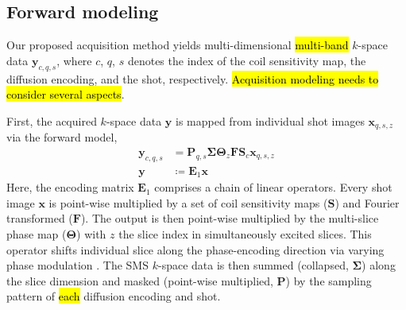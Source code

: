 \documentclass[preprint,12pt,authoryear,review]{elsarticle}
\begin{document}
    \pagebreak

    \subsection{Forward modeling}
    Our proposed acquisition method yields
    multi-dimensional \hl{multi-band} 
    $k$-space data $\mathbf{y}_{c,q,s}$,
    where $c$, $q$, $s$ denotes the index of the coil sensitivity map,
    the diffusion encoding, and the shot, respectively.
    \hl{Acquisition modeling needs to consider several aspects}.

    First, the acquired $k$-space data $\mathbf{y}$ is mapped from
    individual shot images $\mathbf{x}_{q,s,z}$ via the forward model,
    \begin{align}
        \mathbf{y}_{c,q,s} &= \mathbf{P}_{q,s} \mathbf{\Sigma} \mathbf{\Theta}_{z} \mathbf{F} \mathbf{S}_c \mathbf{x}_{q,s,z} \\
        \mathbf{y} &\coloneqq \mathbf{E}_1 \mathbf{x} \label{EQU:model_shot}
    \end{align}
    Here, the encoding matrix $\mathbf{E}_1$ comprises a chain of linear operators.
    Every shot image $\mathbf{x}$ is point-wise multiplied
    by a set of coil sensitivity maps ($\mathbf{S}$) and Fourier transformed ($\mathbf{F}$).
    The output is then point-wise multiplied by the multi-slice phase map ($\mathbf{\Theta}$)
    with $z$ the slice index in simultaneously excited slices.
    This operator shifts individual slice
    along the phase-encoding direction
    via varying phase modulation \citep{breuer_2005_caipi}.
    The SMS $k$-space data is then
    summed (collapsed, $\mathbf{\Sigma}$) along the slice dimension and
    masked (point-wise multiplied, $\mathbf{P}$) by
    the sampling pattern of \hl{each} diffusion encoding and shot.
\end{document}
